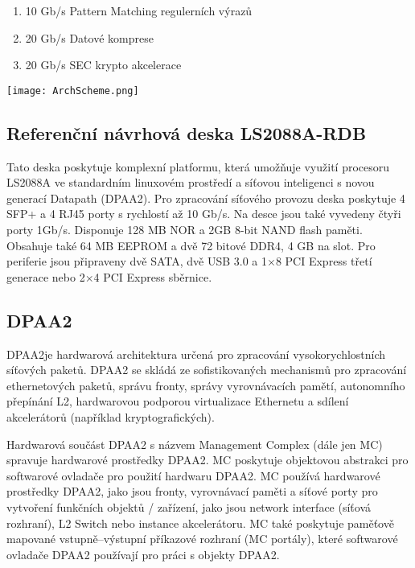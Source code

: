 \documentclass[11pt, titlepage, a4paper]{article}
\begin{document}
		\begin{enumerate}
		\item 10 Gb/s Pattern Matching regulerních výrazů
		\item 20 Gb/s Datové komprese
		\item 20 Gb/s SEC krypto akcelerace
		\end{enumerate}

		\begin{center}
		\texttt{[image: ArchScheme.png]}
		\end{center}

		\subsection{Referenční návrhová deska LS2088A-RDB}
		Tato deska poskytuje komplexní platformu, která umožňuje využití procesoru LS2088A ve standardním linuxovém prostředí
		a síťovou inteligenci s novou generací Datapath (DPAA2).
		Pro zpracování síťového provozu deska poskytuje 4 SFP+ a 4 RJ45 porty s rychlostí až 10 Gb/s. Na desce jsou také vyvedeny čtyři porty 1Gb/s.
		Disponuje 128 MB NOR a 2GB 8-bit NAND flash paměti. Obsahuje také 64 MB EEPROM a dvě 72 bitové DDR4, 4 GB na slot.
		Pro periferie jsou připraveny dvě SATA, dvě USB 3.0 a 1$\times$8 PCI Express třetí generace nebo 2$\times$4 PCI Express sběrnice.


		\newpage
		\subsection{DPAA2}

		DPAA2\footnotemark[5] je hardwarová architektura určená pro zpracování vysokorychlostních síťových paketů.
		DPAA2 se skládá ze sofistikovaných mechanismů pro zpracování ethernetových paketů, správu fronty, správy vyrovnávacích pamětí, autonomního přepínání L2,
		hardwarovou podporou virtualizace Ethernetu a sdílení akcelerátorů (například kryptografických).

		Hardwarová součást DPAA2 s názvem Management Complex (dále jen MC) spravuje hardwarové prostředky DPAA2. MC poskytuje objektovou abstrakci pro softwarové ovladače pro použití hardwaru DPAA2.
		MC používá hardwarové prostředky DPAA2, jako jsou fronty, vyrovnávací paměti a síťové porty pro vytvoření funkčních objektů / zařízení, jako jsou network interface (síťová rozhraní), L2 Switch nebo instance akcelerátoru.
		MC také poskytuje paměťově mapované vstupně--výstupní příkazové rozhraní (MC portály), které softwarové ovladače DPAA2 používají pro práci s objekty DPAA2.
		
\end{document}
